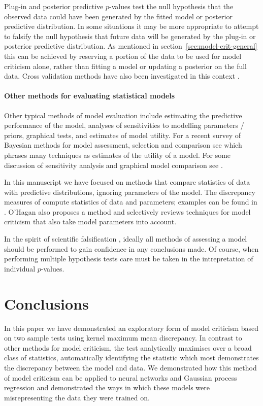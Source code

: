 Plug-in and posterior predictive $p$-values test the null hypothesis that the observed data could have been generated by the fitted model or posterior predictive distribution.
In some situations it may be more appropriate to attempt to falsify the null hypothesis that future data will be generated by the plug-in or posterior predictive distribution.
As mentioned in section~\ref{sec:model-crit-general} this can be achieved by reserving a portion of the data to be used for model criticism alone, rather than fitting a model or updating a posterior on the full data.
Cross validation methods have also been investigated in this context \citep{Gelfand1992-ow, Marshall2007-hd}.

\paragraph{Other methods for evaluating statistical models}

Other typical methods of model evaluation include estimating the predictive performance of the model, analyses of sensitivities to modelling parameters / priors, graphical tests, and estimates of model utility.
For a recent survey of Bayesian methods for model assessment, selection and comparison see \cite{Vehtari2012-oh} which phrases many techniques as estimates of the utility of a model.
For some discussion of sensitivity analysis and graphical model comparison see \citep[e.g.][]{Gelman2013-st}.

In this manuscript we have focused on methods that compare statistics of data with predictive distributions, ignoring parameters of the model.
The discrepancy measures of \cite{Gelman1996-ez} compute statistics of data and parameters; examples can be found in \cite{Gelman2013-st}.
O'Hagan \citep{OHagan2003-bc} also proposes a method and selectively reviews techniques for model criticism that also take model parameters into account.

In the spirit of scientific falsification \citep[e.g.][]{Popper2005-qq}, ideally all methods of assessing a model should be performed to gain confidence in any conclusions made.
Of course, when performing multiple hypothesis tests care must be taken in the intrepretation of individual $p$-values.

\section{Conclusions}

In this paper we have demonstrated an exploratory form of model criticism based on two sample tests using kernel maximum mean discrepancy.
In contrast to other methods for model criticism, the test analytically maximises over a broad class of statistics, automatically identifying the statistic which most demonstrates the discrepancy between the model and data.
We demonstrated how this method of model criticism can be applied to neural networks and Gaussian process regression and demonstrated the ways in which these models were misrepresenting the data they were trained on.

